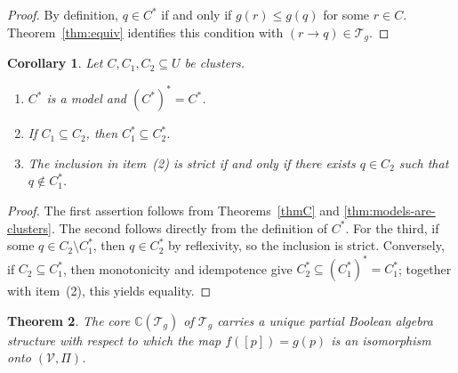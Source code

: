 \documentclass{article}   	%
\theoremstyle{plain}
\newtheorem{theorem}{Theorem}[section]
\newtheorem{corollary}[theorem]{Corollary}
\theoremstyle{definition}
\theoremstyle{remark}
\begin{document}
\begin{proof}
By definition, $q\in C^*$ if and only if $g(r)\le g(q)$ for some $r\in C$.
Theorem~\ref{thm:equiv} identifies this condition with
$(r\to q)\in\mathcal T_g$.
\end{proof}

\begin{corollary}
\label{cor:star-properties}
Let $C,C_1,C_2\subseteq U$ be clusters.
\begin{enumerate}
\item $C^*$ is a model and $(C^*)^*=C^*$.
\item If $C_1\subseteq C_2$, then $C_1^*\subseteq C_2^*$.
\item The inclusion in item~(2) is strict if and only if there exists
      $q\in C_2$ such that $q\notin C_1^*$.
\end{enumerate}
\end{corollary}

\begin{proof}
The first assertion follows from Theorems~\ref{thmC} and
\ref{thm:models-are-clusters}.  The second follows directly from the definition
of $C^*$.  For the third, if some $q\in C_2\setminus C_1^*$, then
$q\in C_2^*$ by reflexivity, so the inclusion is strict.  Conversely, if
$C_2\subseteq C_1^*$, then monotonicity and idempotence give
$C_2^*\subseteq(C_1^*)^*=C_1^*$; together with item~(2), this yields equality.
\end{proof}
\begin{theorem}
\label{thm:corepba}
The core $\mathbb C(\mathcal T_g)$ of\/ $\mathcal T_g$ carries a unique partial
Boolean algebra structure with respect to which the map
$f([p])=g(p)$ is an isomorphism onto $(\mathcal V,\Pi)$.
\end{theorem}
\end{document}
